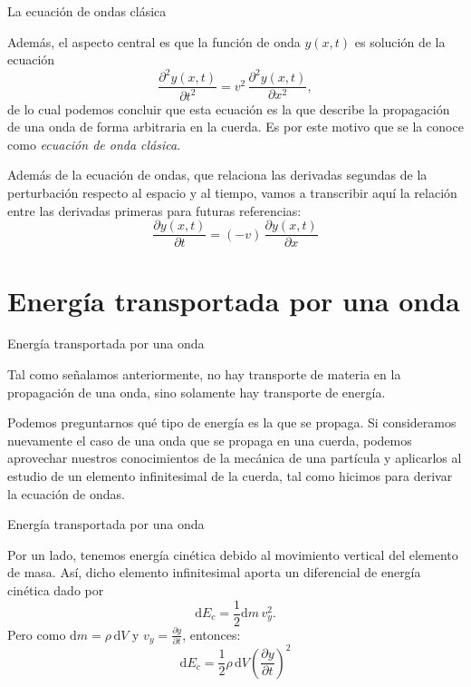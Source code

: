 \documentclass[11pt,handout,aspectratio=1610]{beamer}
\newcommand{\diff}[0]{\text{d}}
\newcommand{\pdiff}[2]{\frac{\partial #1}{\partial #2}}
\newcommand{\pddiff}[2]{\frac{\partial^2 #1}{\partial #2^2}}
\newcommand{\vs}{\vspace{11pt}}
\begin{document}
\begin{frame}{La ecuación de ondas clásica}
    
    Además, el aspecto central es que la función de onda $y(x,t)$ es solución de la ecuación $$ \pddiff{y (x,t)}{t} = v^2 \, \pddiff{y (x,t)}{x}, $$ de lo cual podemos concluir que esta ecuación es la que describe la propagación de una onda de forma arbitraria en la cuerda. Es por este motivo que se la conoce como \emph{ecuación de onda clásica}.

    \vs

    Además de la ecuación de ondas, que relaciona las derivadas segundas de la perturbación respecto al espacio y al tiempo, vamos a transcribir aquí la relación entre las derivadas primeras para futuras referencias:
    $$ \pdiff{y(x,t)}{t} = \left(-v\right) \, \pdiff{y(x,t)}{x} $$
    
\end{frame}

\section{Energía transportada por una onda}

\begin{frame}{Energía transportada por una onda}

    Tal como señalamos anteriormente, no hay transporte de materia en la propagación de una onda, sino solamente hay transporte de energía. 
    
    \vs 
    
    Podemos preguntarnos qué tipo de energía es la que se propaga. Si consideramos nuevamente el caso de una onda que se propaga en una cuerda, podemos aprovechar nuestros conocimientos de la mecánica de una partícula y aplicarlos al estudio de un elemento infinitesimal de la cuerda, tal como hicimos para derivar la ecuación de ondas.

\end{frame}

\begin{frame}{Energía transportada por una onda}

    Por un lado, tenemos energía cinética debido al movimiento vertical del elemento de masa. Así, dicho elemento infinitesimal aporta un diferencial de energía cinética dado por $$ \diff E_c = \frac{1}{2} \diff m \, v_y^2. $$ Pero como $\diff m = \rho \, \diff V $ y $v_y = \pdiff{y}{t}$, entonces: $$ \diff E_c = \frac{1}{2} \rho \, \diff V \left(\pdiff{y}{t}\right)^2 $$

\end{frame}
\end{document}
